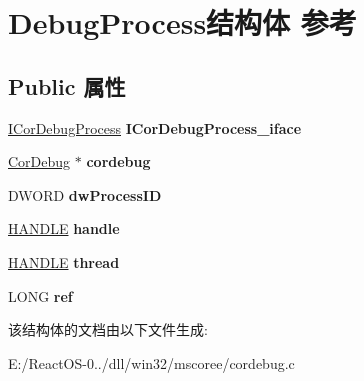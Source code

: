 \hypertarget{struct_debug_process}{}\section{Debug\+Process结构体 参考}
\label{struct_debug_process}
\subsection*{Public 属性}
\begin{DoxyCompactItemize}
\item 
\mbox{\label{struct_debug_process_a725bb0a97335a7e634b2749474124949}} 
\hyperlink{interface_i_cor_debug_process}{I\+Cor\+Debug\+Process} {\bfseries I\+Cor\+Debug\+Process\+\_\+iface}
\item 
\mbox{\label{struct_debug_process_a8b6c03ea0bfae0c63109841bc977b355}} 
\hyperlink{struct_cor_debug}{Cor\+Debug} $\ast$ {\bfseries cordebug}
\item 
\mbox{\label{struct_debug_process_a54757dae9bd7f3f954b93002a9599fb6}} 
D\+W\+O\+RD {\bfseries dw\+Process\+ID}
\item 
\mbox{\label{struct_debug_process_a96f49b5afefcabd403d5213bd3c66d4a}} 
\hyperlink{interfacevoid}{H\+A\+N\+D\+LE} {\bfseries handle}
\item 
\mbox{\label{struct_debug_process_a9f516fa54dcb7a6754c5af5f63d3dbc0}} 
\hyperlink{interfacevoid}{H\+A\+N\+D\+LE} {\bfseries thread}
\item 
\mbox{\label{struct_debug_process_af5d90750a3642179a46f3d5c48f25a6a}} 
L\+O\+NG {\bfseries ref}
\end{DoxyCompactItemize}


该结构体的文档由以下文件生成\+:\begin{DoxyCompactItemize}
\item 
E\+:/\+React\+O\+S-\/0../dll/win32/mscoree/cordebug.\+c\end{DoxyCompactItemize}
